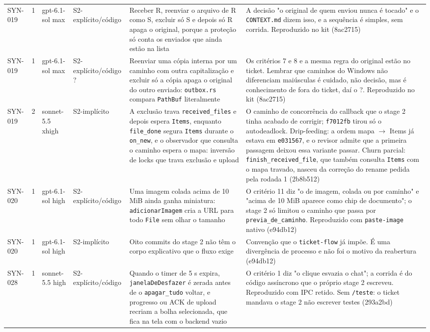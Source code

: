 \documentclass[11pt,a4paper]{article}
\begin{document}
{\begin{longtable}{@{}l c >{\raggedright\arraybackslash}p{1.7cm} >{\raggedright\arraybackslash}p{2.4cm} >{\raggedright\arraybackslash}p{4.0cm} >{\raggedright\arraybackslash}p{4.2cm}@{}}
SYN-019 & 1 & gpt-6.1-sol max & S2-explícito/código & Receber R, reenviar o arquivo de R como S, excluir só S e depois só R apaga o original, porque a proteção só conta os enviados que ainda estão na lista & A decisão "o original de quem enviou nunca é tocado" e o \texttt{CONTEXT.md} dizem isso, e a sequência é simples, sem corrida. Reproduzido no kit (8ac2715)\\
SYN-019 & 1 & gpt-6.1-sol max & S2-explícito/código ? & Reenviar uma cópia interna por um caminho com outra capitalização e excluir só a cópia apaga o original do outro enviado: \texttt{outbox.rs} compara \texttt{PathBuf} literalmente & Os critérios 7 e 8 e a mesma regra do original estão no ticket. Lembrar que caminhos do Windows não diferenciam maiúsculas é cuidado, não decisão, mas é conhecimento de fora do ticket, daí o ?. Reproduzido no kit (8ac2715)\\
SYN-019 & 2 & sonnet-5.5 xhigh & S2-implícito & A exclusão trava \texttt{received\_files} e depois espera \texttt{Items}, enquanto \texttt{file\_done} segura \texttt{Items} durante o \texttt{on\_new}, e o observador que consulta o caminho espera o mapa: inversão de locks que trava exclusão e upload & O caminho de concorrência do callback que o stage 2 tinha acabado de corrigir; \texttt{f7012fb} tirou só o autodeadlock. Drip-feeding: a ordem mapa $\to$ Items já estava em \texttt{e031567}, e o revisor admite que a primeira passagem deixou essa variante passar. Churn parcial: \texttt{finish\_received\_file}, que também consulta \texttt{Items} com o mapa travado, nasceu da correção do rename pedida pela rodada 1 (2b8b512)\\
SYN-020 & 1 & gpt-6.1-sol high & S2-explícito/código & Uma imagem colada acima de 10 MiB ainda ganha miniatura: \texttt{adicionarImagem} cria a URL para todo \texttt{File} sem olhar o tamanho & O critério 11 diz "o de imagem, colada ou por caminho" e "acima de 10 MiB aparece como chip de documento"; o stage 2 só limitou o caminho que passa por \texttt{previa\_de\_caminho}. Reproduzido com \texttt{paste-image} nativo (e94db12)\\
SYN-020 & 1 & gpt-6.1-sol high & S2-implícito & Oito commits do stage 2 não têm o corpo explicativo que o fluxo exige & Convenção que o \texttt{ticket-flow} já impõe. É uma divergência de processo e não foi o motivo da reabertura (e94db12)\\
SYN-028 & 1 & sonnet-5.5 high & S2-explícito/código & Quando o timer de 5 s expira, \texttt{janelaDeDesfazer} é zerada antes de o \texttt{apagar\_tudo} voltar, e progresso ou ACK de upload recriam a bolha selecionada, que fica na tela com o backend vazio & O critério 1 diz "o clique esvazia o chat"; a corrida é do código assíncrono que o próprio stage 2 escreveu. Reproduzido com IPC retido. Sem \texttt{/teste}: o ticket mandava o stage 2 não escrever testes (293a2bd)\\

\end{longtable}}
\end{document}
